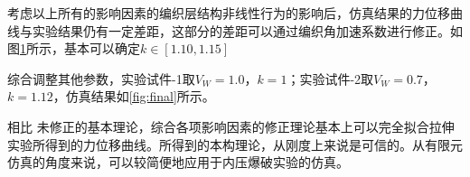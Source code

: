 考虑以上所有的影响因素的编织层结构非线性行为的影响后，仿真结果的力位移曲线与实验结果仍有一定差距，这部分的差距可以通过编织角加速系数进行修正。如图\ref{fig:k-MOD}所示，基本可以确定$ k\in\left[ 1.10,1.15\right]  $





\begin{figure}[!htp]
\centering
{}
\label{fig:k-MOD}
\end{figure}

综合调整其他参数，实验试件-1取$ V_W=1.0$，$ k=1 $；实验试件-2取$ V_W=0.7 $，$ k=1.12 $，仿真结果如\ref{fig:final}所示。

相比 未修正的\ha 基本理论，综合各项影响因素的修正理论基本上可以完全拟合拉伸实验所得到的力位移曲线。所得到的本构理论，从刚度上来说是可信的。从有限元仿真的角度来说，可以较简便地应用于内压爆破实验的仿真。 

